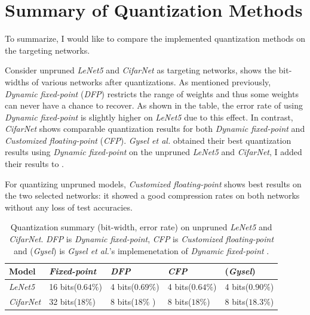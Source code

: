 \documentclass[a4paper,12pt]{report}
\begin{document}
\section{Summary of Quantization Methods}
To summarize, I would like
to compare the implemented quantization methods on the targeting networks.

Consider unpruned \textit{LeNet5} and \textit{CifarNet} as targeting networks,
shows the bit-widths of various networks after quantizations.
As mentioned previously, \textit{Dynamic fixed-point} (\textit{DFP}) restricts
the range of weights and thus some weights can never have a chance to recover.
As shown in the table, the error rate of using \textit{Dynamic fixed-point} is
slightly higher on \textit{LeNet5} due to this effect.
In contrast, \textit{CifarNet} shows comparable quantization results for both
\textit{Dynamic fixed-point} and \textit{Customized floating-point} (\textit{CFP}).
\textit{Gysel et al.} obtained their best quantization results using \textit{Dynamic fixed-point} on the unpruned
\textit{LeNet5} and \textit{CifarNet}, I added their results to .

For quantizing unpruned models, \textit{Customized floating-point}
shows best results on the two selected networks: it showed a good compression
rates on both networks without any loss of test accuracies.

\begin{table}[!h]
  \centering
  \begin{tabular}{lllll}
    \hline
    Model             & \textit{Fixed-point}  &\textit{DFP}   &\textit{CFP}   &(\textit{Gysel})\\
    \hline
    \hline
    \textit{LeNet5}   & 16 bits($0.64\%$)     &4 bits($0.69\%$)              &4 bits($0.64\%$)   & 4 bits($0.90\%$)\\
    \textit{CifarNet} & 32 bits($18\%$)      &8 bits($18\%$ )              &8 bits($18\%$)   & 8 bits($18.3\%$)\\
    \hline
    \hline
  \end{tabular}
  \caption{Quantization summary (bit-width, error rate) on unpruned
  \textit{LeNet5} and \textit{CifarNet}. \textit{DFP} is \textit{Dynamic fixed-point},
  \textit{CFP} is \textit{Customized floating-point} and (\textit{Gysel}) is
  \textit{Gysel et al.}'s implemenetation of \textit{Dynamic fixed-point} \cite{Gysel}.}
  \label{tab:quantize_summary}
\end{table}
\end{document}
